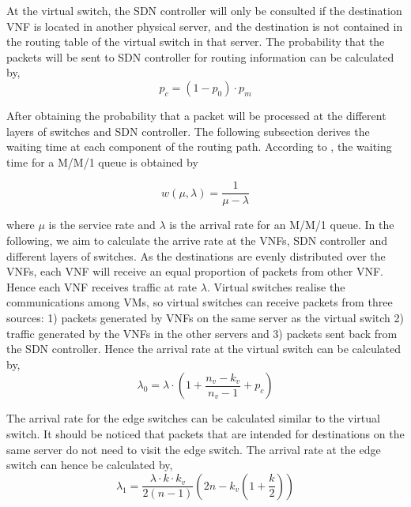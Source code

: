At the virtual switch, the SDN controller will only be consulted if the destination VNF is located in another physical server, and the destination is not contained in the routing table of the virtual switch in that server. The probability that the packets will be sent to SDN controller for routing information can be calculated by,
\begin{equation}
    \label{eq:p_sdn}
    p_{c} = (1 - p_{0}) \cdot p_m
\end{equation}

After obtaining the probability that a packet will be processed at the different layers of switches and SDN controller. The following subsection derives the waiting time at each component of the routing path. According to \cite{Kleinrock75}, the waiting time for a M/M/1 queue is obtained by

\begin{equation}
    \label{eq:p_latency}
    w(\mu, \lambda) = \frac{1}{\mu - \lambda}
\end{equation}

where $\mu$ is the service rate and $\lambda$ is the arrival rate for an M/M/1 queue. In the following, we aim to calculate the arrive rate at the VNFs, SDN controller and different layers of switches. As the destinations are evenly distributed over the VNFs, each VNF will receive an equal proportion of packets from other VNF. Hence each VNF receives traffic at rate $\lambda$. Virtual switches realise the communications among VMs, so virtual switches can receive packets from three sources: 1) packets generated by VNFs on the same server as the virtual switch 2) traffic generated by the VNFs in the other servers and 3) packets sent back from the SDN controller. Hence the arrival rate at the virtual switch can be calculated by,
\begin{equation}
    \label{eq:arr_srv}
    \lambda_0 = \lambda \cdot \left(1+\frac{n_v - k_v}{n_v - 1} + p_c \right)
\end{equation}

The arrival rate for the edge switches can be calculated similar to the virtual switch. It should be noticed that packets that are intended for destinations on the same server do not need to visit the edge switch. The arrival rate at the edge switch can hence be calculated by,
\begin{equation}
    \label{eq:arr_edge}
    \lambda_1 = \frac{\lambda \cdot k \cdot k_v}{2(n - 1)}\left(2n - k_v \left( 1 + \frac{k}{2} \right)\right)
\end{equation}

